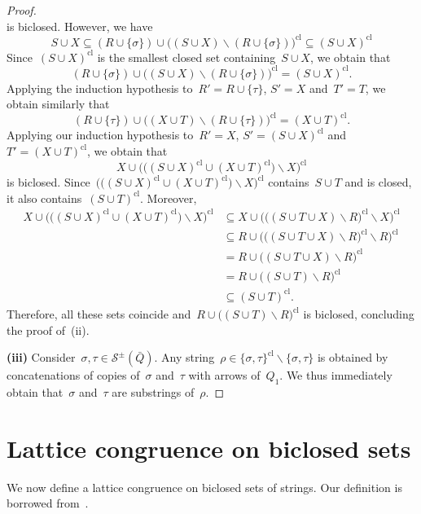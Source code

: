 \documentclass{memo-l}
\theoremstyle{definition}
\newcommand{\ssm}{\smallsetminus} %
\newcommand{\strings}{\mathcal{S}} %
\newcommand{\closure}[1]{#1^{\mathrm{cl}}} %
\begin{document}
\begin{proof}
\[\]
is biclosed. However, we have
\[
S \cup X \subseteq (R \cup \{\sigma\}) \cup \closure{\big( ( S \cup X ) \ssm (R \cup \{\sigma\}) \big)} \subseteq \closure{(S \cup X)}
\]
Since~$\closure{(S \cup X)}$ is the smallest closed set containing~$S \cup X$, we obtain that
\[
(R \cup \{\sigma\}) \cup \closure{\big( ( S \cup X ) \ssm (R \cup \{\sigma\}) \big)} = \closure{(S \cup X)}.
\]
Applying the induction hypothesis to~$R' = R \cup \{\tau\}$, $S' = X$ and~$T' = T$, we obtain similarly that
\[
(R \cup \{\tau\}) \cup \closure{\big( ( X \cup T ) \ssm (R \cup \{\tau\}) \big)} = \closure{(X \cup T)}.
\]
Applying our induction hypothesis to~$R' = X$, $S' = \closure{(S \cup X)}$ and~$T' = \closure{(X \cup T)}$, we obtain that
\[
X \cup \closure{\big( \big( \closure{(S \cup X)} \cup \closure{(X \cup T)} \big) \ssm X \big)}
\]
is biclosed. Since~$\closure{\big( \big( \closure{(S \cup X)} \cup \closure{(X \cup T)} \big) \ssm X \big)}$ contains~$S \cup T$ and is closed, it also contains~$\closure{(S \cup T)}$.
Moreover,
\begin{align*}
X \cup \closure{\big( \big( \closure{(S \cup X)} \cup \closure{(X \cup T)} \big) \ssm X \big)}
& \subseteq X \cup \closure{\big( \closure{\big( (S \cup T \cup X) \ssm R\big)} \ssm X \big)} \\
& \subseteq R \cup \closure{\big( \closure{\big( (S \cup T \cup X) \ssm R\big)} \ssm R \big)} \\
& = R \cup \closure{\big( (S \cup T \cup X) \ssm R \big)} \\
& = R \cup \closure{\big( (S \cup T) \ssm R \big)} \\
& \subseteq \closure{(S \cup T)}.
\end{align*}
Therefore, all these sets coincide and~$R \cup \closure{\big( (S \cup T) \ssm R \big)}$ is biclosed, concluding the proof of~(ii).

\medskip\noindent
{\bf (iii)}
Consider~$\sigma, \tau \in \strings^\pm(\bar Q)$.
Any string~$\rho \in \closure{\{\sigma, \tau\}} \ssm \{\sigma, \tau\}$ is obtained by concatenations of copies of~$\sigma$ and~$\tau$ with arrows of~$Q_1$.
We thus immediately obtain that~$\sigma$ and~$\tau$ are substrings of~$\rho$.
\end{proof}

\section{Lattice congruence on biclosed sets}
\label{sec:latticeCongruence}

We now define a lattice congruence on biclosed sets of strings.
Our definition is borrowed from~\cite[Sect.~7]{McConville}.
\end{document}
